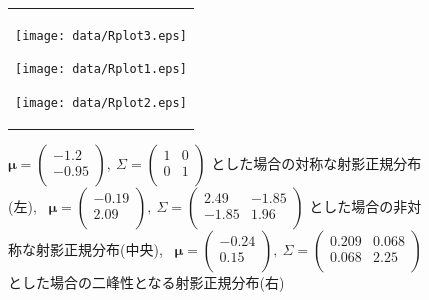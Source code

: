 \documentclass[a4j,11pt]{jarticle}
\begin{document}
\begin{figure}[H]
 \begin{tabular}{c}
\hspace{0.5cm}
 \begin{minipage}{0.33\hsize}
  \begin{center}
   \texttt{[image: data/Rplot3.eps]}
  \end{center}
 \end{minipage}
\hspace{-1.0cm}
 \begin{minipage}{0.33\hsize}
  \begin{center}
 \texttt{[image: data/Rplot1.eps]}
  \end{center}
 \end{minipage}
\hspace{-1.0cm}
 \begin{minipage}{0.33\hsize}
  \begin{center}
   \texttt{[image: data/Rplot2.eps]}
  \end{center}
 \end{minipage}
  \end{tabular}
\caption[Text excluding the matrix]{
$\bm \mu = \begin{pmatrix} -1.2 \\ -0.95 \\ \end{pmatrix}, \ \Sigma = \begin{pmatrix}  1 & 0 \\ 0 & 1 \\ \end{pmatrix}$
とした場合の対称な射影正規分布(左), 
\ $\bm \mu = \begin{pmatrix} -0.19 \\ 2.09 \\ \end{pmatrix}, \ \Sigma = \begin{pmatrix} 2.49 & -1.85 \\ -1.85 & 1.96 \\ \end{pmatrix}$ とした場合の非対称な射影正規分布(中央), 
\ $\bm \mu = \begin{pmatrix} -0.24 \\ 0.15 \\ \end{pmatrix}, \ \Sigma = \begin{pmatrix} 0.209 & 0.068\\ 0.068 & 2.25 \\ \end{pmatrix}$ とした場合の二峰性となる射影正規分布(右)}
\label{sample_pn}
\end{figure}
\fi
\end{document}
